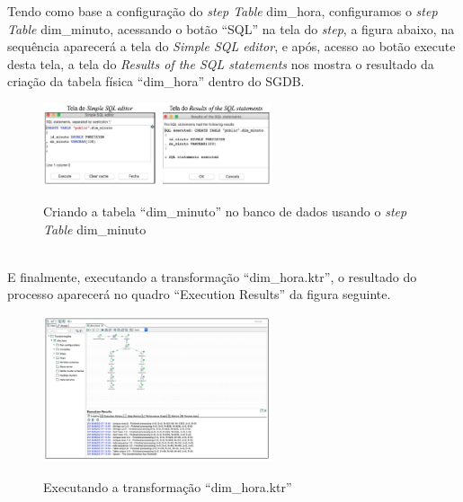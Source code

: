 Tendo como base a configura\c{c}\~{a}o do \textit{step Table} dim\_hora, configuramos o \textit{step Table} dim\_minuto, 
acessando o bot\~{a}o ``SQL'' na tela do \textit{step}, a figura abaixo, na sequ\^{e}ncia aparecer\'{a} a tela do \textit{Simple 
SQL editor}, e ap\'{o}s, acesso ao bot\~{a}o execute desta tela, a tela do \textit{Results of the SQL statements} 
nos mostra o resultado da cria\c{c}\~{a}o da tabela f\'{i}sica ``dim\_hora'' dentro do SGDB. 

\begin{figure}[H]
	\vspace*{0,2cm}
    \centering
    \caption{Criando a tabela ``dim\_minuto'' no banco de dados usando o \textit{step Table} dim\_minuto}
    \includegraphics[width=0.6\textwidth]{./04-figuras/figura-tb-dim-minuto}
    \label{fig:ilustfigtbdimminuto}
\end{figure}
\vspace*{-0,9cm}
{\raggedright {}} \\

E finalmente, executando a transforma\c{c}\~{a}o ``dim\_hora.ktr'', o resultado do 
processo aparecer\'{a} no quadro ``Execution Results'' da figura seguinte.

\begin{figure}[H]
	\vspace*{0,2cm}
    \centering
    \caption{Executando a transforma\c{c}\~{a}o ``dim\_hora.ktr''}
    \includegraphics[width=0.6\textwidth]{./04-figuras/figura-exec-dim-hora}
    \label{fig:ilustfigexecdimhora}
\end{figure}
\vspace*{-0,9cm}
{\raggedright {}} \\

